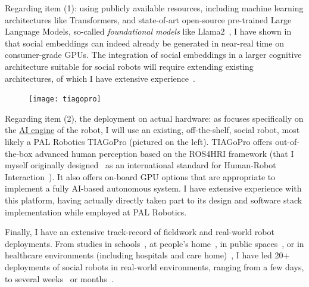 Regarding item (1): using publicly available resources, including machine
learning architectures like Transformers, and state-of-art open-source
pre-trained Large Language Models, so-called \emph{foundational models} like
Llama2~\cite{touvron2023llama}, I have shown in~\cite{lemaignan2024social} that
social embeddings can indeed already be generated in near-real time on
consumer-grade GPUs. The integration of social embeddings in a larger cognitive
architecture suitable for social robots will require extending existing
architectures, of which I have extensive
experience~\cite{lemaignan2017artificial, lemaignan2015pyrobots,
baxter2016cognitive,lemaignan2014challenges,lemaignan2011what}.

\begin{figure}
    \centering
    \vspace{-10pt}
    \texttt{[image: tiagopro]}
    \label{fig|tiagopro}
\end{figure}

Regarding item (2), the deployment on actual hardware: as \project focuses
specifically on the \ul{AI engine} of the robot, I will use an existing,
off-the-shelf, social robot, most likely a PAL Robotics TIAGoPro (pictured on
the left). TIAGoPro offers out-of-the-box advanced human perception based on the
ROS4HRI framework (that I myself originally
designed~\autocite{mohamed2021ros4hri} as an international standard for
Human-Robot Interaction~\autocite{lemaignan2022ros}). It also offers on-board
GPU options that are appropriate to implement a fully AI-based autonomous
system.  I have extensive experience with this platform, having actually
directly taken part to its design and software stack implementation while
employed at PAL Robotics.

Finally, I have an extensive track-record of fieldwork and real-world robot
deployments. From studies in schools~\autocite{hood2015when,
lemaignan2016learning, jacq2016building,
baxter2015wider,kennedy2016cautious,senft2018robots,lemaignan2022social}, at
people's home~\autocite{mondada2015ranger}, in public
spaces~\autocite{alhafnawi2022deliberative}, or in healthcare environments
(including hospitals and care
home)~\autocite{winkle2020couch,cooper2023challenges}, I have led 20+
deployments of social robots in real-world environments, ranging from a few
days, to several weeks~\autocite{jacq2016building,lemaignan2022social} or
months~\autocite{winkle2020couch}.


